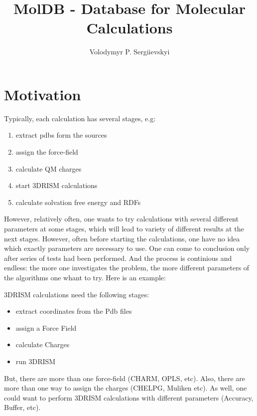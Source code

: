 \documentclass[12pt]{article}
\title{MolDB - Database for Molecular Calculations}
\author{Volodymyr P. Sergiievskyi}
\begin{document}
\maketitle


\setcounter{section}{-1} 

\section{Motivation}

Typically, each calculation has several stages, e.g:
\begin{enumerate}
\item extract pdbs form the sources
\item assign the force-field
\item calculate QM charges
\item start 3DRISM calculations
\item calculate solvation free energy and RDFs
\end{enumerate}

However, relatively often, one wants to try calculations with several different parameters  at some stages, which will lead to variety of different results at the next stages.
However, often before starting the calculations, one have no idea which exactly parameters are necessary to use.
One can come to conclusion only after series of tests had been performed. And the process is continious and endless: the more one investigates the problem, the more different parameters of the algorithms one whant to try. 
Here is an example:

3DRISM calculations need the following stages:
\begin{itemize}
\item extract coordinates from the Pdb files
\item assign a Force Field
\item calculate Charges
\item run 3DRISM
\end{itemize}

But, there are more than one force-field (CHARM, OPLS, etc).
Also, there are more than one way to assign the charges (CHELPG, Muliken etc).
As well, one could want to perform  3DRISM calculations with different parameters (Accuracy, Buffer, etc).
\end{document}
